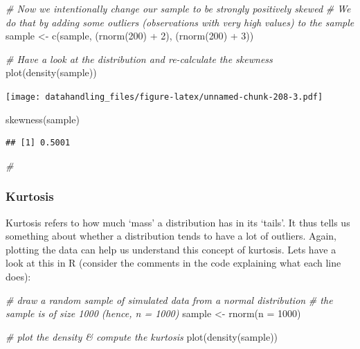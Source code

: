 \documentclass[
  12pt,
]{style/krantz}
\newenvironment{Shaded}{\begin{snugshade}}{\end{snugshade}}
\newcommand{\AttributeTok}[1]{\textcolor[rgb]{0.77,0.63,0.00}{#1}}
\newcommand{\CommentTok}[1]{\textcolor[rgb]{0.56,0.35,0.01}{\textit{#1}}}
\newcommand{\DecValTok}[1]{\textcolor[rgb]{0.00,0.00,0.81}{#1}}
\newcommand{\FunctionTok}[1]{\textcolor[rgb]{0.00,0.00,0.00}{#1}}
\newcommand{\NormalTok}[1]{#1}
\newcommand{\OtherTok}[1]{\textcolor[rgb]{0.56,0.35,0.01}{#1}}
\newcommand{\SpecialCharTok}[1]{\textcolor[rgb]{0.00,0.00,0.00}{#1}}
\begin{document}
\begin{Shaded}
\begin{Highlighting}[]
\CommentTok{\# Now we intentionally change our sample to be strongly positively skewed}
\CommentTok{\# We do that by adding some outliers (observations with very high values) to the sample }
\NormalTok{sample }\OtherTok{\textless{}{-}} \FunctionTok{c}\NormalTok{(sample, (}\FunctionTok{rnorm}\NormalTok{(}\DecValTok{200}\NormalTok{) }\SpecialCharTok{+} \DecValTok{2}\NormalTok{), (}\FunctionTok{rnorm}\NormalTok{(}\DecValTok{200}\NormalTok{) }\SpecialCharTok{+} \DecValTok{3}\NormalTok{))}

\CommentTok{\# Have a look at the distribution and re{-}calculate the skewness}
\FunctionTok{plot}\NormalTok{(}\FunctionTok{density}\NormalTok{(sample))}
\end{Highlighting}
\end{Shaded}

\texttt{[image: datahandling\_files/figure-latex/unnamed-chunk-208-3.pdf]}

\begin{Shaded}
\begin{Highlighting}[]
\FunctionTok{skewness}\NormalTok{(sample)}
\end{Highlighting}
\end{Shaded}

\begin{verbatim}
## [1] 0.5001
\end{verbatim}

\begin{Shaded}
\begin{Highlighting}[]
\CommentTok{\#}
\end{Highlighting}
\end{Shaded}

\hypertarget{kurtosis}{%
\subsubsection{Kurtosis}\label{kurtosis}}

Kurtosis refers to how much `mass' a distribution has in its `tails'. It thus tells us something about whether a distribution tends to have a lot of outliers. Again, plotting the data can help us understand this concept of kurtosis. Lets have a look at this in R (consider the comments in the code explaining what each line does):

\begin{Shaded}
\begin{Highlighting}[]
\CommentTok{\# draw a random sample of simulated data from a normal distribution}
\CommentTok{\# the sample is of size 1000 (hence, n = 1000)}
\NormalTok{sample }\OtherTok{\textless{}{-}} \FunctionTok{rnorm}\NormalTok{(}\AttributeTok{n =} \DecValTok{1000}\NormalTok{)}

\CommentTok{\# plot the density \& compute the kurtosis}
\FunctionTok{plot}\NormalTok{(}\FunctionTok{density}\NormalTok{(sample))}
\end{Highlighting}
\end{Shaded}
\end{document}
